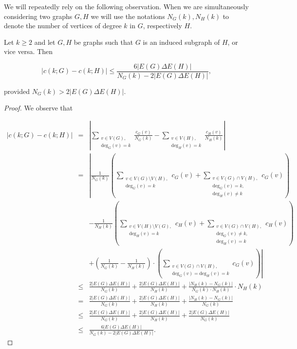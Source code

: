 We will repeatedly rely on the following observation.
When we are simultaneously considering two graphs $G,H$
we will use the notations $N_G(k), N_H(k)$ to 
denote the number of vertices of degree $k$ in $G$, respectively $H$.

\begin{lemma}\label{lem:ckGckH}
Let $k\geq 2$ and let $G, H$ be graphs such that $G$ is an induced subgraph of $H$, or vice versa.
Then

$$ \left| c(k;G) - c(k;H) \right| \leq \frac{6|E(G)\Delta E(H)|}{N_G(k) - 2|E(G)\Delta E(H)|}, $$

\noindent
provided $N_G(k) > 2|E(G)\Delta E(H)|$.
\end{lemma}

\begin{proof} 
We observe that
 
$$ \begin{array}{rcl} 
|c(k; G)-c(k;H)| 
& = & \displaystyle
\left| \sum_{\substack{v\in V(G), \\ \text{deg}_G(v)=k}} \frac{c_G(v)}{N_G(k)} - 
\sum_{\substack{v\in V(H), \\ \text{deg}_{H}(v)=k}} \frac{c_{H}(v)}{N_{H}(k)} \right| \\[8ex]
& = & \displaystyle 
\left| \frac{1}{N_G(k)} \left( \sum_{\substack{v\in V(G)\setminus V(H), \\ \text{deg}_G(v)=k} } c_G(v)
+ \sum_{\substack{v\in V(G)\cap V(H), \\ \text{deg}_G(v)=k, \\ \text{deg}_{H}(v)\neq k}} c_G(v) \right) \right. \\
& & \displaystyle
- \frac{1}{N_{H}(k)} \left(\sum_{\substack{ v\in V(H)\setminus V(G), \\ \text{deg}_{H}(v)=k} } c_{H}(v)
+ \sum_{\substack{v\in V(G)\cap V(H), \\ \text{deg}_G(v)\neq k, \\ \text{deg}_{H}(v)=k}} c_{H}(v) \right) \\
& & \displaystyle  
\left. + \left(\frac{1}{N_G(k)}-\frac{1}{N_{H}(k)} \right) \cdot 
\left( \sum_{\substack{v \in V(G)\cap V(H), \\ \text{deg}_G(v)=\text{deg}_{H}(v)=k}}
c_G(v) \right) \right| \\[8ex]
 & \leq & \displaystyle
 \frac{2|E(G)\Delta E(H)|}{N_G(k)} + \frac{2|E(G)\Delta E(H)|}{N_{H}(k)} + 
 \frac{|N_{H}(k) - N_G(k)|}{N_G(k)\cdot N_{H}(k)} \cdot N_{H}(k) \\[5ex]
 & = & \displaystyle 
 \frac{2|E(G)\Delta E(H)|}{N_G(k)} + \frac{2|E(G)\Delta E(H)|}{N_{H}(k)} + \frac{|N_{H}(k) - N_G(k)|}{N_G(k)} \\[5ex]
 & \leq & \displaystyle
 \frac{2|E(G)\Delta E(H)|}{N_G(k)} + \frac{2|E(G)\Delta E(H)|}{N_{H}(k)} + \frac{2|E(G)\Delta E(H)|}{N_G(k)} \\[5ex]
 & \leq & \displaystyle
\frac{6 |E(G)\Delta E(H)|}{N_G(k)-2|E(G)\Delta E(H)|}.
\end{array} $$


\end{proof}
